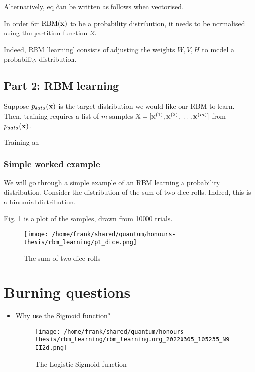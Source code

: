 \documentclass[11pt]{article}
\begin{document}
Alternatively, eq \^ can be written as follows when vectorised.


In order for \(\text{RBM}(\mathbf{x})\) to be a probability distribution, it needs to be normalised using the partition function \(Z\).


Indeed, RBM 'learning' consists of adjusting the weights \(W, V, H\) to model a probability distribution.

\subsection{Part 2: RBM learning}
\label{sec:org41541c1}

Suppose \(p_{data}(\mathbf{x})\) is the target distribution we would like our RBM to learn. Then, training requires a list of \(m\) samples \(\mathbb{X} =  [\mathbf{x}^{(1)}, \mathbf{x}^{(2)}, \dots, \mathbf{x}^{(m)}]\) from \(p_{data}(\mathbf{x})\).


Training an


\subsubsection{Simple worked example}
\label{sec:orga8b9c3f}

We will go through a simple example of an RBM learning a probability distribution.
Consider the distribution of the sum of two dice rolls. Indeed, this is a binomial distribution.

Fig. \ref{fig:p1-dice} is a plot of the samples, drawn from 10000 trials.




\begin{figure}[htbp]
\centering
\texttt{[image: /home/frank/shared/quantum/honours-thesis/rbm\_learning/p1\_dice.png]}
\caption{\label{fig:p1-dice}The sum of two dice rolls}
\end{figure}


\section{Burning questions}
\label{sec:org2900fa3}
\begin{itemize}
\item Why use the Sigmoid function?
\begin{figure}[htbp]
\centering
\texttt{[image: /home/frank/shared/quantum/honours-thesis/rbm\_learning/rbm\_learning.org\_20220305\_105235\_N9II2d.png]}
\caption{The Logistic Sigmoid function}
\end{figure}
\end{itemize}
\end{document}
